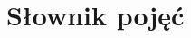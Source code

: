\documentclass[11pt,wide]{mwart}
\begin{document}
  
  
  \tableofcontents
  \pagebreak
\section{\Large Słownik pojęć}
\begin{multicols}{2}
  
\end{multicols}
\end{document}
